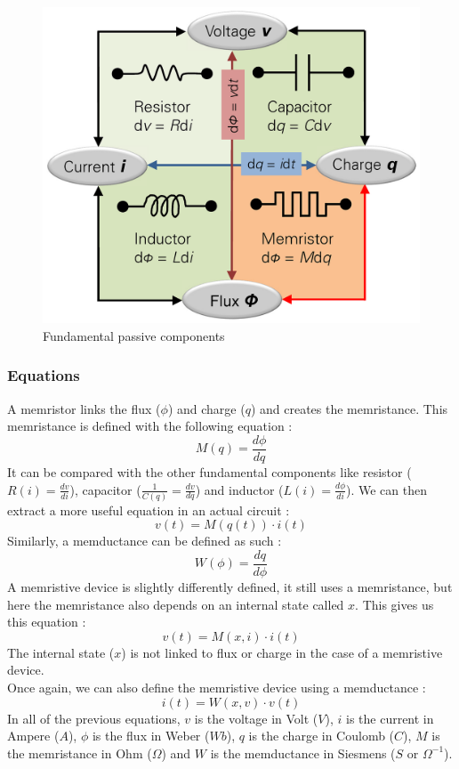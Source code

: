 \begin{figure}[H]
  \centering
  \includegraphics{Figures/Memristor.png}
  \caption{Fundamental passive components}
  \label{fig:fundComp}
\end{figure}

\subsubsection{Equations}
A memristor links the flux ($\phi$) and charge ($q$) and creates the memristance.
This memristance is defined with the following equation :
\begin{equation}
  M(q)=\frac{d\phi}{dq}
\end{equation}
It can be compared with the other fundamental components like resistor ($R(i)=\frac{dv}{di}$), capacitor ($\frac{1}{C(q)}=\frac{dv}{dq}$) and inductor ($L(i)=\frac{d\phi}{di}$).
We can then extract a more useful equation in an actual circuit :
\begin{equation}
  v(t)=M(q(t))\cdot i(t)
\end{equation}
Similarly, a memductance can be defined as such :
\begin{equation}
  W(\phi)=\frac{dq}{d\phi}
\end{equation}
A memristive device is slightly differently defined, it still uses a memristance, but here the memristance also depends on an internal state called $x$. This gives us this equation :
\begin{equation}
  v(t)=M(x,i)\cdot i(t)
\end{equation}
The internal state ($x$) is not linked to flux or charge in the case of a memristive device.\\
Once again, we can also define the memristive device using a memductance :
\begin{equation}
  i(t)=W(x,v)\cdot v(t)
\end{equation}
In all of the previous equations, $v$ is the voltage in Volt ($V$), $i$ is the current in Ampere ($A$), $\phi$ is the flux in Weber ($Wb$), $q$ is the charge in Coulomb ($C$), $M$ is the memristance in Ohm ($\Omega$) and $W$ is the memductance in Siesmens ($S$ or $\Omega^{-1}$).

